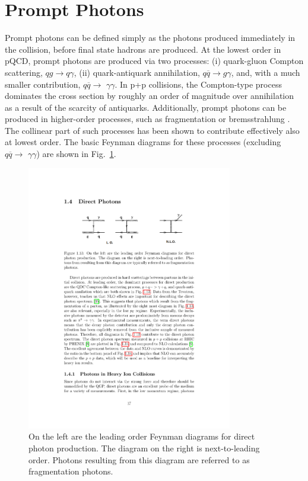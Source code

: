 \section{Prompt Photons}
Prompt photons can be defined simply as the photons produced immediately in the collision, before final state hadrons are produced. At the lowest order in pQCD, prompt photons are produced via two processes: (i) quark-gluon Compton scattering, $qg \to q\gamma$, (ii) quark-antiquark annihilation, $q\overline{q} \to g\gamma$, and, with a much smaller contribution,  $q\overline{q}\to$ $\gamma\gamma$. In p+p collisions, the Compton-type process dominates the cross section by roughly an order of magnitude over annihilation as a result of the scarcity of antiquarks. Additionally, prompt photons can be produced in higher-order processes, such as fragmentation or bremsstrahlung \cite{Aurenche1993}. The collinear part of such processes has been shown to contribute effectively also at lowest order. The basic Feynman diagrams for these processes (excluding $q\overline{q}\to$ $\gamma\gamma$) are shown in Fig.~\ref{fig:prompt_feynman}.

\begin{figure}[htpb]
  \centering
  \includegraphics[width=0.8\textwidth]{Introduction/prompt_photons.pdf}
  \caption{On the left are the leading order Feynman diagrams for direct photon production. The diagram on the right is next-to-leading order. Photons resulting from this diagram are referred to as fragmentation photons.}
  \label{fig:prompt_feynman}
\end{figure}

